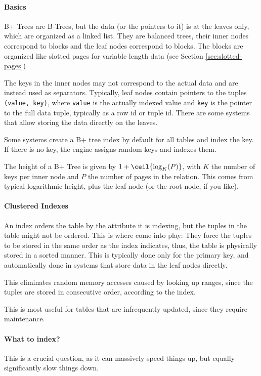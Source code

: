 \paragraph{Basics}
B+ Trees are B-Trees, but the data (or the pointers to it) is at the leaves only, which are organized as a linked list.
They are balanced trees, their inner nodes correspond to blocks and the leaf nodes correspond to blocks.
The blocks are organized like slotted pages for variable length data (see Section \ref{sec:slotted-pages})

The keys in the inner nodes may not correspond to the actual data and are instead used as separators.
Typically, leaf nodes contain pointers to the tuples \texttt{(value, key)}, where \texttt{value} is the actually indexed value
and \texttt{key} is the pointer to the full data tuple, typically as a row id or tuple id.
There are some systems that allow storing the data directly on the leaves.

Some systems create a B+ tree index by default for all tables and index the key. If there is no key, the engine assigns random keys and indexes them.

The height of a B+ Tree is given by $1 + \ceil{\log_K(P)}$, with $K$ the number of keys per inner node and $P$ the number of pages in the relation.
This comes from typical logarithmic height, plus the leaf node (or the root node, if you like).


\paragraph{Clustered Indexes}
An index orders the table by the attribute it is indexing, but the tuples in the table might not be ordered.
This is where  come into play: They force the tuples to be stored in the same order as the index indicates,
thus, the table is physically stored in a sorted manner. This is typically done only for the primary key,
and automatically done in systems that store data in the leaf nodes directly.

This eliminates random memory accesses caused by looking up ranges, since the tuples are stored in consecutive order, according to the index.

This is most useful for tables that are infrequently updated, since they require maintenance.


\paragraph{What to index?}
This is a crucial question, as it can massively speed things up, but equally significantly slow things down.

